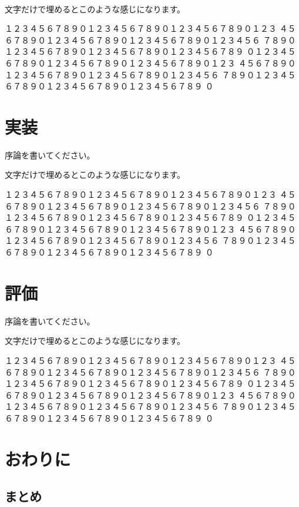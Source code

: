 \documentclass{eniepaper}
\begin{document}
　\newpage

   文字だけで埋めるとこのような感じになります。

   \noindent
   １２３４５６７８９０１２３４５６７８９０１２３４５６７８９０１２３
   ４５６７８９０１２３４５６７８９０１２３４５６７８９０１２３４５６
   ７８９０１２３４５６７８９０１２３４５６７８９０１２３４５６７８９
   ０１２３４５６７８９０１２３４５６７８９０１２３４５６７８９０１２３
   ４５６７８９０１２３４５６７８９０１２３４５６７８９０１２３４５６
   ７８９０１２３４５６７８９０１２３４５６７８９０１２３４５６７８９
   ０

   \chapter{実装}
   
   序論を書いてください。\newpage

   文字だけで埋めるとこのような感じになります。

   \noindent
   １２３４５６７８９０１２３４５６７８９０１２３４５６７８９０１２３
   ４５６７８９０１２３４５６７８９０１２３４５６７８９０１２３４５６
   ７８９０１２３４５６７８９０１２３４５６７８９０１２３４５６７８９
   ０１２３４５６７８９０１２３４５６７８９０１２３４５６７８９０１２３
   ４５６７８９０１２３４５６７８９０１２３４５６７８９０１２３４５６
   ７８９０１２３４５６７８９０１２３４５６７８９０１２３４５６７８９
   ０
   
   \chapter{評価}
   
   序論を書いてください。\newpage

   文字だけで埋めるとこのような感じになります。

   \noindent
   １２３４５６７８９０１２３４５６７８９０１２３４５６７８９０１２３
   ４５６７８９０１２３４５６７８９０１２３４５６７８９０１２３４５６
   ７８９０１２３４５６７８９０１２３４５６７８９０１２３４５６７８９
   ０１２３４５６７８９０１２３４５６７８９０１２３４５６７８９０１２３
   ４５６７８９０１２３４５６７８９０１２３４５６７８９０１２３４５６
   ７８９０１２３４５６７８９０１２３４５６７８９０１２３４５６７８９
   ０

   \chapter{おわりに}
   
   \section{まとめ}
   
\end{document}

